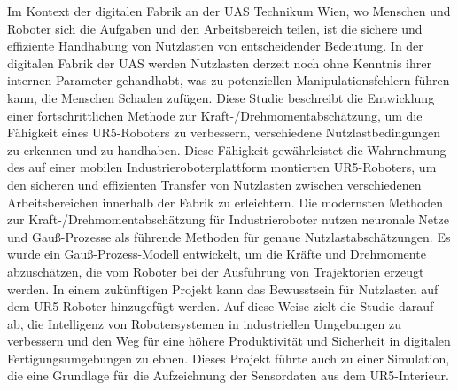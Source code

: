     {
     Im Kontext der digitalen Fabrik an der UAS Technikum Wien, wo Menschen und Roboter sich die Aufgaben und den Arbeitsbereich teilen, 
    ist die sichere und effiziente Handhabung von Nutzlasten von entscheidender Bedeutung. In der digitalen Fabrik der UAS werden Nutzlasten derzeit noch ohne Kenntnis 
    ihrer internen Parameter gehandhabt, was zu potenziellen Manipulationsfehlern führen kann, die Menschen Schaden zufügen. Diese Studie beschreibt 
    die Entwicklung einer fortschrittlichen Methode zur Kraft-/Drehmomentabschätzung, um die Fähigkeit eines UR5-Roboters zu verbessern, verschiedene Nutzlastbedingungen zu erkennen und zu handhaben. 
    Diese Fähigkeit gewährleistet die Wahrnehmung des auf einer mobilen Industrieroboterplattform montierten UR5-Roboters, um den sicheren und effizienten Transfer
    von Nutzlasten zwischen verschiedenen Arbeitsbereichen innerhalb der Fabrik zu erleichtern. Die modernsten Methoden zur Kraft-/Drehmomentabschätzung für Industrieroboter nutzen 
    neuronale Netze und Gauß-Prozesse als führende Methoden für genaue Nutzlastabschätzungen. Es wurde ein Gauß-Prozess-Modell entwickelt, um 
    die Kräfte und Drehmomente abzuschätzen, die vom Roboter bei der Ausführung von Trajektorien erzeugt werden. In einem zukünftigen Projekt kann das Bewusstsein für Nutzlasten 
    auf dem UR5-Roboter hinzugefügt werden. Auf diese Weise zielt die Studie darauf ab, die Intelligenz von Robotersystemen in industriellen Umgebungen zu verbessern und den Weg für eine höhere 
    Produktivität und Sicherheit in digitalen Fertigungsumgebungen zu ebnen. Dieses Projekt führte auch zu einer Simulation, die eine Grundlage für die Aufzeichnung der 
    Sensordaten aus dem UR5-Interieur.
    }
